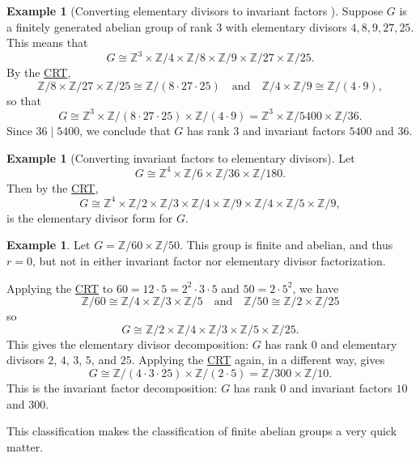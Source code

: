 \documentclass[12pt]{report}
\numberwithin{equation}{section}
\numberwithin{theorem}{chapter}
\theoremstyle{definition}
\newtheorem{example}[theorem]{Example}
\newtheorem*{basic properties}{Basic Properties}
\newtheorem*{Important Remark}{Important Remark}
\newcommand{\Z}{\mathbb{Z}}
\begin{document}
\begin{example}[{Converting elementary divisors to invariant factors} ]
Suppose $G$ is a finitely generated abelian group of rank $3$ with elementary divisors $4, 8, 9, 27, 25$. This means that
$$G \cong \Z^{3} \times \Z/4 \times \Z/8 \times \Z/9 \times \Z/27 \times \Z/25.$$
By the \hyperref[CRT]{CRT}, 
$$\Z/8 \times \Z/27 \times \Z/25 \cong \Z/(8 \cdot 27 \cdot 25)
\quad \text{and} \quad
\Z/4\times \Z/9  \cong \Z/(4 \cdot 9),$$
so that
$$G \cong \Z^{3} \times \Z/(8 \cdot 27 \cdot 25) \times \Z/(4 \cdot 9) = \Z^{3} \times \Z/5400 \times \Z/36.$$
Since $36 \mid 5400$, we conclude that $G$ has rank $3$ and invariant factors $5400$ and $36$. 
\end{example}


\begin{example}[Converting invariant factors to elementary divisors]
Let
$$G \cong \Z^{4} \times \Z/6 \times \Z/36 \times \Z/180.$$
Then by the \hyperref[CRT]{CRT},
$$G \cong \Z^{4} \times \Z/2 \times \Z/3 \times \Z/4 \times \Z/9  \times \Z/4 \times \Z/5 \times \Z/9,$$
is the elementary divisor form for $G$.
\end{example}



\begin{example} 
Let $G = \Z/60 \times \Z/50$. This group is finite and abelian, and thus $r=0$, but not in either invariant factor nor elementary divisor factorization.

Applying the \hyperref[CRT]{CRT} to $60 = 12 \cdot 5 = 2^2 \cdot 3 \cdot 5$ and $50 = 2 \cdot 5^2$, we have
$$\Z / 60 \cong \Z / 4 \times \Z / 3 \times \Z / 5 \quad \text{and} \quad \Z/50 \cong \Z/2 \times \Z/25$$
so
$$G \cong \Z/2 \times \Z/4 \times \Z/3 \times \Z/5 \times \Z/25.$$
This gives the elementary divisor decomposition: $G$ has rank $0$ and elementary divisors $2$, $4$, $3$, $5$, and $25$. Applying the \hyperref[CRT]{CRT} again, in a different way, gives
$$G \cong \Z/(4 \cdot 3 \cdot 25) \times \Z/(2 \cdot 5) = \Z/300 \times \Z/10.$$
This is the invariant factor decomposition: $G$ has rank $0$ and invariant factors $10$ and $300$.
\end{example}


This classification makes the classification of finite abelian groups a very quick matter.
\end{document}
